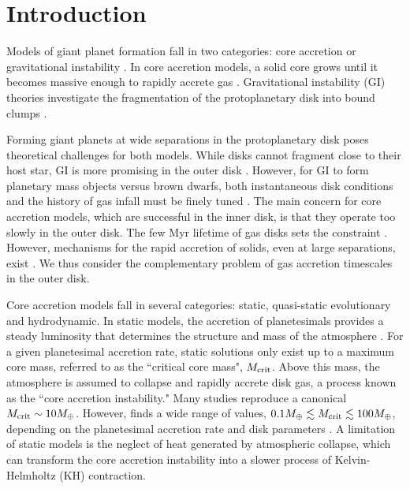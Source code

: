 \documentclass[apj, numberedappendix]{emulateapj}
\newcommand{\MC}{M_{\rm crit}}
\begin{document}
\section{Introduction}
\label{intro}

Models of giant planet formation fall in two categories:  core accretion or gravitational instability \citep{dangelo11, youdin13}. In core accretion models, a solid core grows until it becomes massive enough to rapidly accrete gas \citep{PerCam74, mizuno78}.  Gravitational instability (GI) theories investigate the fragmentation of the protoplanetary disk into bound clumps \citep{cameron78, boss97}. 

Forming giant planets at wide separations in the protoplanetary disk poses theoretical challenges for both models.  While disks cannot fragment close to their host star, GI is more promising in the outer disk \citep{matzner05, rafikov05}.   However,  for GI to form planetary mass objects versus brown dwarfs, both instantaneous disk conditions and the history of gas infall must be finely tuned \citep{kratter10}.  The main concern for core accretion models, which are successful in the inner disk, is that they operate too slowly in the outer disk. The few Myr lifetime of gas disks sets the constraint \citep{williams11}.  However, mechanisms for the rapid accretion of solids, even at large separations, exist \citep{dones93, kenyon09, lambrechts12}. We thus consider the complementary problem of gas accretion timescales in the outer disk.

Core accretion models fall in several categories: static, quasi-static evolutionary and hydrodynamic.
In static models, the accretion of planetesimals provides a steady luminosity that determines the structure and mass of the atmosphere \citep{stevenson82}.    For a given planetesimal accretion rate, static solutions only exist up to a maximum core mass, referred to as the ``critical core mass",  $\MC$. Above this mass, the atmosphere is assumed to collapse and rapidly accrete disk gas, a process known as the ``core accretion instability."  Many studies reproduce a canonical $\MC \sim 10 M_\oplus$.  However, \citet[hereafter R06]{rafikov06} finds a wide range of values, $0.1 M_\oplus \lesssim \MC \lesssim 100 M_\oplus$, depending on the planetesimal accretion rate and disk parameters \citep[see also][]{Raf11}.  A limitation of static models is the neglect of heat generated by atmospheric collapse, which can transform the core accretion instability into a slower process of Kelvin-Helmholtz (KH) contraction.
\end{document}
